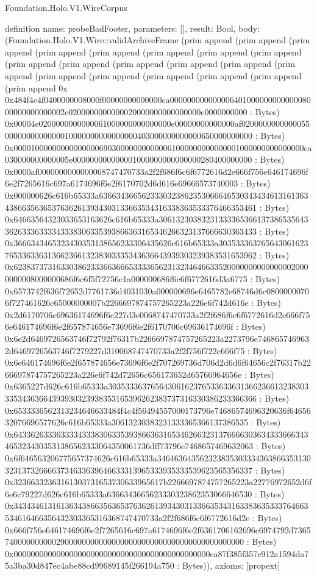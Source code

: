 \begin{lexlean}{Foundation.Holo.V1.WireCorpus}
\begin{semanticmodule}
definition{
  name: probeBadFooter,
  parameters: [],
  result: Bool,
  body: (Foundation.Holo.V1.Wire::validArchiveFrame (prim append (prim append (prim append (prim append (prim append (prim append (prim append (prim append (prim append (prim append (prim append (prim append (prim append (prim append (prim append (prim append (prim append (prim append (prim append (prim append 0x 0x484f4c4f0400000008000f00000000000000ca00000000000000640100000000000008000000000000002e0200000000000020000000000000000e0000000000 : Bytes) 0x00004e0200000000000061000000000000000e00000000000000af02000000000000550000000000000010000000000000000403000000000000650000000000 : Bytes) 0x00001000000000000000690300000000000061000000000000001000000000000000ca030000000000005e000000000000001000000000000000280400000000 : Bytes) 0x0000af0000000000000068747470733a2f2f686f6c6f6772616d2e666f756e646174696f6e2f7265616c697a6174696f6e2f6170702d6d616e69666573740003 : Bytes) 0x000000626c616b65333a636634366562333032386235306664653034343461316136343866356365376362613934303133663534316338363533376466353461 : Bytes) 0x64663564323033653163626c616b65333a3061323038323133336536613738653564336263336333343338306335393866363165346266323137666630363433 : Bytes) 0x3666343465323430353138656233306435626c616b65333a30353336376564306162376533633631366236613238303335343636643939303239383531653962 : Bytes) 0x6238373731633038623336636665333365623132346466335200000000000000020000000008000000686f6c6f5f72756e1a000000686f6c6f6772616d3a6775 : Bytes) 0x6573742f636f72652d7761736d4031030a000000696e6465782e68746d6c08000000706f727461626c65000000007b2266697874757265223a226e6f742d616e : Bytes) 0x2d6170706c69636174696f6e227d3e0068747470733a2f2f686f6c6f6772616d2e666f756e646174696f6e2f657874656e73696f6e2f6170706c69636174696f : Bytes) 0x6e2d6469726563746f72792f76317b2266697874757265223a2273796e7468657469632d6469726563746f7279227d310068747470733a2f2f756f722e666f75 : Bytes) 0x6e646174696f6e2f657874656e73696f6e2f707269736d706d2d6d6f64656c2f76317b2266697874757265223a226e6f742d72656c656173652d65766964656e : Bytes) 0x6365227d626c616b65333a3035333637656430616237653363363136623661323830333534363664393930323938353165396262383737316330386233366366 : Bytes) 0x6533336562313234646633484f4c4f56494557000173796e74686574696320636f6465632076696577626c616b65333a30613230383231333365366137386535 : Bytes) 0x6433626333633334333830633539386636316534626632313766663036343336663434653234303531386562333064350061736dff73796e7468657469632063 : Bytes) 0x6f646563206775657374626c616b65333a3464636435623238353033343638663531303231373266663734633639646633313965333935333539623565356337 : Bytes) 0x32366332363161303731653730633965617b2266697874757265223a22776972652d6f6e6c79227d626c616b65333a6366343665623330323862353066646530 : Bytes) 0x343434613161363438663563653763626139343031336635343163383635333764663534616466356432303365316368747470733a2f2f686f6c6f6772616d2e : Bytes) 0x666f756e646174696f6e2f7265616c697a6174696f6e2f6361706162696c6974792d736574000000000029000000000000000000000000000000000000000000 : Bytes) 0x0000000000000000000000000000000000000000000000ca87f385f357e912a1594da75a3ba30d847ec4abe88cd99689145f266194a750 : Bytes)),
  axioms: [propext]
}


\end{semanticmodule}
\end{lexlean}
